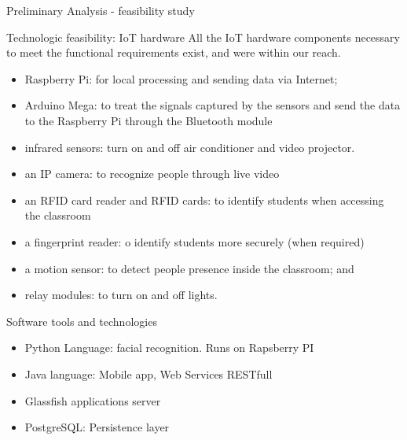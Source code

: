 \documentclass[notes=show, 10pt]{beamer}
\begin{document}
    \begin{frame}{Preliminary Analysis - feasibility study}
        \begin{block}{Technologic feasibility: IoT hardware}
            All the IoT hardware components necessary to meet the functional requirements exist, and were within our reach.\\
            \begin{itemize}
                \item Raspberry Pi: for local processing and sending data via Internet;
                \item Arduino Mega: to treat the signals captured by the sensors and send the data to the Raspberry Pi through the Bluetooth module
                \item infrared sensors: turn on and off air conditioner and video projector.
                \item an IP camera: to recognize people through live video
                \item an RFID card reader and RFID cards: to identify students when accessing the classroom
                \item a fingerprint reader: o identify students more securely (when required)
                \item a motion sensor: to detect people presence inside the classroom; and
                \item relay modules: to turn on and off lights.
            \end{itemize}
           
        \end{block}
    \end{frame}
    
    \begin{frame}{Software tools and technologies}
            \begin{itemize}
                \item Python Language: facial recognition. Runs on Rapsberry PI
                \item Java language: Mobile app, Web Services RESTfull
                \item Glassfish applications server
                \item PostgreSQL: Persistence layer
            \end{itemize}
    \end{frame}
    
\end{document}
